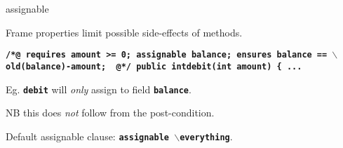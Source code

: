 \documentclass[
pdf,
nocolorBG,
slideColor,
erik,
]{prosper}
\newcommand{\code}[1]{{\rm \texttt{\textbf{\small #1}}}}
\newcommand{\old}     {\(\backslash\)old}
\newcommand{\everything}{\(\backslash\)everything}
\newcommand{\nothing}{\(\backslash\)nothing}
\begin{document}
\begin{slide}{assignable}
\vspace*{-3ex}

{\blue Frame properties} limit possible side-effects of methods.


\begin{alltt}
\texttt{\textbf{\small {\green /*@}   requires amount >= 0;
     {\blue assignable} balance;
         ensures balance == \old(balance)-amount;
{ \green  @*/}
  public int{\green debit}(int amount) \{ 
    ...
}}
\end{alltt}
Eg. \code{debit} will {\em only} assign to field \code{balance}.

NB this does {\em not} follow from the post-condition.

\medskip

Default assignable clause: \code{assignable \everything}.

\end{slide}


\end{document}
